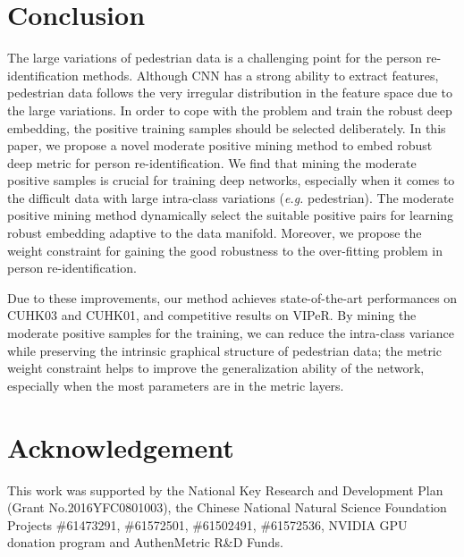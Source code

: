 \documentclass[runningheads]{llncs}
\begin{document}
\section{Conclusion}
\label{section_Conclusion}

The large variations of pedestrian data is a challenging point for the person re-identification methods.
Although CNN has a strong ability to extract features, pedestrian data follows the very irregular distribution in the feature space due to the large variations.
In order to cope with the problem and train the robust deep embedding, the positive training samples should be selected deliberately.
In this paper, we propose a novel moderate positive mining method to embed robust deep metric for person re-identification.
We find that mining the moderate positive samples is crucial for training deep networks, especially when it comes to the difficult data with large intra-class variations (\emph{e.g.} pedestrian).
The moderate positive mining method dynamically select the suitable positive pairs for learning robust embedding adaptive to the data manifold.
Moreover, we propose the weight constraint for gaining the good robustness to the over-fitting problem in person re-identification.

Due to these improvements, our method achieves state-of-the-art performances on CUHK03 and CUHK01, and competitive results on VIPeR.
By mining the moderate positive samples for the training, we can reduce the intra-class variance while preserving the intrinsic graphical structure of pedestrian data;
the metric weight constraint helps to improve the generalization ability of the network, especially when the most parameters are in the metric layers.

\section{Acknowledgement}
\label{section_Acknowledgement}
This work was supported by the National Key Research and Development Plan (Grant No.2016YFC0801003), the Chinese National Natural Science Foundation Projects \#61473291, \#61572501, \#61502491, \#61572536, NVIDIA GPU donation program and AuthenMetric R\&D Funds.








\clearpage


\end{document}
